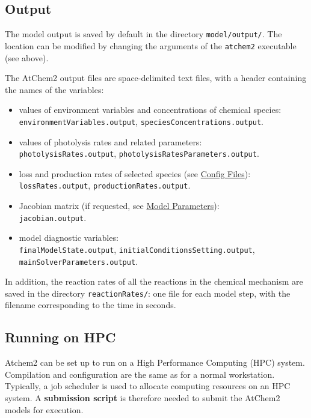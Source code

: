 \subsection{Output} \label{subsec:output}

The model output is saved by default in the directory
\texttt{model/output/}. The location can be modified by changing the
arguments of the \texttt{atchem2} executable (see above).

The AtChem2 output files are space-delimited text files, with a header
containing the names of the variables:

\begin{itemize}
\item values of environment variables and concentrations of chemical
  species:\\ \texttt{environmentVariables.output},
  \texttt{speciesConcentrations.output}.
\item values of photolysis rates and related parameters:\\
  \texttt{photolysisRates.output},
  \texttt{photolysisRatesParameters.output}.
\item loss and production rates of selected species (see
  \hyperref[sec:config]{Config Files}):\\ \texttt{lossRates.output},
  \texttt{productionRates.output}.
\item Jacobian matrix (if requested, see
  \hyperref[sec:parameters]{Model Parameters}):\\
  \texttt{jacobian.output}.
\item model diagnostic variables:\\ \texttt{finalModelState.output},
  \texttt{initialConditionsSetting.output},
  \texttt{mainSolverParameters.output}.
\end{itemize}

In addition, the reaction rates of all the reactions in the chemical
mechanism are saved in the directory \texttt{reactionRates/}: one file
for each model step, with the filename corresponding to the time in
seconds.

\subsection{Running on HPC} \label{subsec:running-on-hpc}

Atchem2 can be set up to run on a High Performance Computing (HPC)
system. Compilation and configuration are the same as for a normal
workstation. Typically, a job scheduler is used to allocate computing
resources on an HPC system. A \textbf{submission script} is therefore
needed to submit the AtChem2 models for execution.

